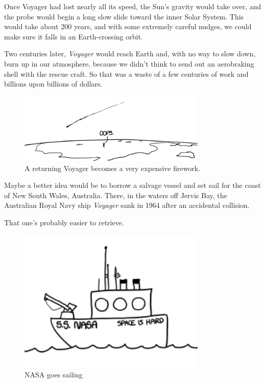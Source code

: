 {Once Voyager had lost nearly all its speed, the Sun’s gravity would take over, and the probe would begin a long slow slide toward the inner Solar System. This would take about 200 years, and with some extremely careful nudges, we could make sure it falls in an Earth-crossing orbit.}

{Two centuries later, \emph{Voyager} would reach Earth and, with no way to slow down, burn up in our atmosphere, because we didn’t think to send out an aerobraking shell with the rescue craft. So that was a waste of a few centuries of work and billions upon billions of dollars.}

\begin{figure}[!htbp]
\centering
\includegraphics[scale=0.5, max width=0.8\textwidth]{imgs/a/38/voyager_burn_up.png}
\caption{A returning Voyager becomes a very expensive firework.}
\end{figure}

{Maybe a better idea would be to borrow a salvage vessel and set sail for the coast of New South Wales, Australia. There, in the waters off Jervis Bay, the Australian Royal Navy ship \emph{Voyager} sank in 1964 after an accidental collision.}

{That one’s probably easier to retrieve.}

\begin{figure}[!htbp]
\centering
\includegraphics[scale=0.5, max width=0.8\textwidth]{imgs/a/38/voyager_salvage.png}
\caption{NASA goes sailing}
\end{figure}

